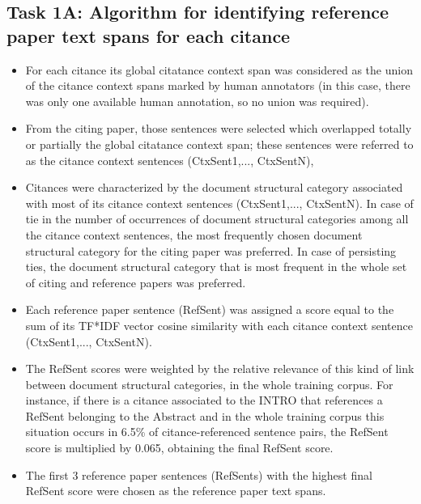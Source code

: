 \documentclass[11pt]{article}
\begin{document}
\subsection{Task 1A: Algorithm for identifying reference paper text spans for each citance}

\begin{itemize}
\item{For each citance its global citatance context span was considered as the union 
of the citance context spans} marked by human annotators (in this case, there 
was only one available human annotation, so no union was required).
\item{From the citing paper, those sentences were selected} which overlapped totally 
or partially the global citatance context span; these sentences were referred 
to as the citance context sentences (CtxSent1,..., CtxSentN),
\item{Citances were characterized by the document structural category 
associated with most of its citance context sentences 
(CtxSent1,..., CtxSentN)}. In case of tie in the number of occurrences of 
document structural categories among all the citance context sentences, the most 
frequently chosen document structural category for the citing paper was preferred. 
In case of persisting ties, the document structural category that is most frequent 
in the whole set of citing and reference papers was preferred.
\item{Each reference paper sentence (RefSent) was assigned a score} equal 
to the sum of its TF*IDF vector cosine similarity with each citance context 
sentence (CtxSent1,..., CtxSentN).
\item{The RefSent scores were weighted by the relative relevance} of this kind 
of link between document structural categories,  in the whole training corpus. 
For instance, if there is a citance associated to the INTRO that references a 
RefSent belonging to the Abstract and in the whole training corpus this situation 
occurs in 6.5\% of citance-referenced sentence pairs, the RefSent score is 
multiplied by 0.065, obtaining the final RefSent score.
\item{The first 3 reference paper sentences} (RefSents) with the highest 
final RefSent score were chosen as the reference paper text spans.
\end{itemize}
\end{document}
